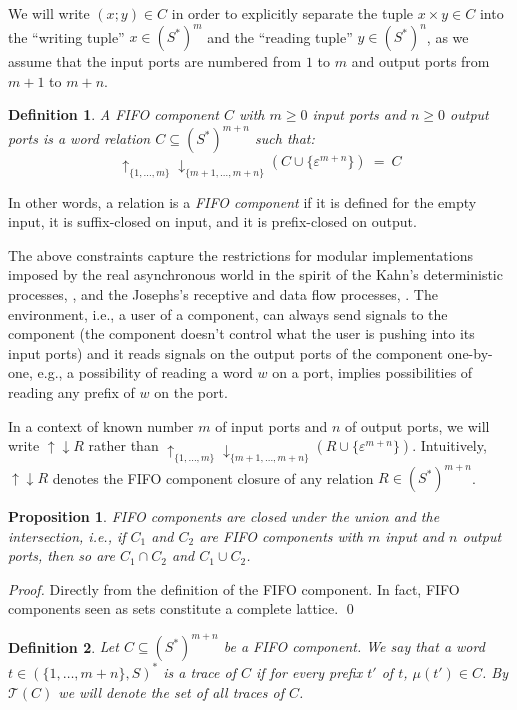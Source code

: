 \documentclass{llncs}
\newtheorem{prop}[thm]{Proposition}
\newtheorem{defn}{Definition}
\newcommand{\udarrow}{{\uparrow\downarrow}}
\begin{document}
We will write $(x;y)\in C$ in order to explicitly separate the tuple
$x\times y \in C$ into the ``writing tuple'' $x\in (S^\ast)^{m}$ and
the ``reading tuple'' $y\in (S^\ast)^{n}$, as we assume that the input
ports are numbered from $1$ to $m$ and output ports from $m+1$ to
$m+n$.

\begin{defn} 
  A FIFO component $C$ with $m\geq 0$ input ports and $n\geq 0$ output
  ports is a word relation $C\subseteq (S^\ast)^{m+n}$ such that:
  \[ 
  {\uparrow_{\{1,\ldots,m\}}\downarrow_{\{m+1,\ldots,m+n\}}}(C
  \cup\{ \varepsilon^{m+n}\}) ~ = ~ C
  \]
\end{defn}

In other words, a relation is a \emph{FIFO component} if it is
defined for the empty input, it is suffix-closed on input, and it is
prefix-closed on output.

The above constraints capture the restrictions for modular
implementations imposed by the real asynchronous world in the spirit
of the Kahn's deterministic processes, \cite{kahn-74}, and the
Josephs's receptive and data flow processes,
\cite{josephs-92,josephs-04}. The environment, i.e., a user of a
component, can always send signals to the component (the component
doesn't control what the user is pushing into its input ports) and it
reads signals on the output ports of the component one-by-one, e.g., a
possibility of reading a word $w$ on a port, implies possibilities of
reading any prefix of $w$ on the port.

In a context of known number $m$ of input ports and $n$ of output
ports, we will write ${\udarrow}R$ rather than
${\uparrow_{\{1,\ldots,m\}}\downarrow_{\{m+1,\ldots,m+n\}}}(R \cup\{
\varepsilon^{m+n}\})$. Intuitively, ${\udarrow}R$ denotes
the FIFO component closure of any relation $R\in (S^\ast)^{m+n}$.

\begin{prop}\label{prop:lattice}
  FIFO components are closed under the union and the intersection, i.e.,
  if $C_1$ and $C_2$ are FIFO components with $m$ input and
  $n$ output ports, then so are $C_1\cap C_2$ and $C_1\cup C_2$. 
\end{prop}

\begin{proof}
  Directly from the definition of the FIFO component. In fact, FIFO
  components seen as sets constitute a complete lattice. \qed
\end{proof}

\begin{defn}
  Let $C\subseteq (S^\ast)^{m+n}$ be a FIFO component. We say that a
  word $t\in (\{1,\ldots,m+n\},S)^\ast$ is a \emph{trace} of $C$ if
  for every prefix $t'$ of $t$, $\mu(t')\in C$.  By $\mathcal{T}(C)$
  we will denote the set of all traces of $C$.
\end{defn}
\end{document}
